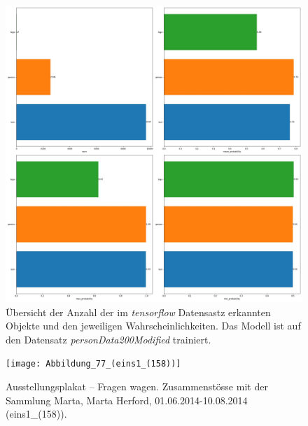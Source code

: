 \documentclass[a4paper,12pt,ngerman]{article}
\begin{document}
\newpage
\begin{figure}[ht]
\includegraphics[width=\linewidth]{Analyse_trainiert_(PersonData200Modified)}
\centering
\caption{Übersicht der Anzahl der im \textit{tensorflow} Datensastz erkannten Objekte und den jeweiligen Wahrscheinlichkeiten. Das Modell ist auf den Datensatz \textit{personData200Modified} trainiert.}
\end{figure}

\newpage
\begin{figure}[H]
\texttt{[image: Abbildung\_77\_(eins1\_(158))]}
\centering
\caption{Ausstellungsplakat -- Fragen wagen. Zusammenstösse mit der Sammlung Marta, Marta Herford, 01.06.2014-10.08.2014 (eins1\_(158)).}
\end{figure}
\end{document}
